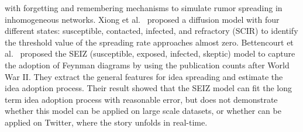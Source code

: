 with forgetting and remembering mechanisms to simulate rumor spreading in inhomogeneous networks.
Xiong et al.~\cite{Xiong20122103} proposed a diffusion model with four different states: susceptible, contacted, infected, and refractory (SCIR) to identify the threshold value of the spreading rate approaches almost zero.
Bettencourt et al.~\cite{powerofgoodidea:2006} proposed the SEIZ (susceptible, exposed, infected, skeptic) model to capture the adoption of Feynman diagrams by using the publication counts after World War II. They extract the general features for idea spreading and estimate the idea adoption process. Their result showed that
the SEIZ model can fit the long term idea adoption process with reasonable error, but does not demonstrate whether this model can be applied on large scale datasets, or whether can be applied on Twitter, where the story unfolds in real-time.

